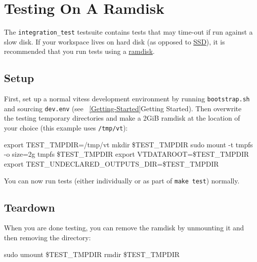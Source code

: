 \section{Testing On A Ramdisk}\label{Testing-On-A-Ramdisk}

The {\tt integration\_test} testsuite contains tests that may time-out if run against a slow disk. If your workspace lives on hard disk (as opposed to \href{http://en.wikipedia.org/wiki/Solid-state\_drive}{SSD}), it is recommended that you run tests using a \href{http://en.wikipedia.org/wiki/RAM\_drive}{ramdisk}.

\subsection{Setup}\hypertarget{setup}{}\label{setup}

First, set up a normal vitess development environment by running {\tt bootstrap.sh} and sourcing {\tt dev.env} (see ~\ref{Getting-Started}{Getting Started}). Then overwrite the testing temporary directories and make a 2GiB ramdisk at the location of your choice (this example uses {\tt /tmp/vt}):

\begin{codesample2}
  export TEST_TMPDIR=/tmp/vt
  mkdir \${TEST_TMPDIR}
  sudo mount -t tmpfs -o size=2g tmpfs \${TEST_TMPDIR}
  export VTDATAROOT=\${TEST_TMPDIR}
  export TEST_UNDECLARED_OUTPUTS_DIR=\${TEST_TMPDIR}
\end{codesample2}


You can now run tests (either individually or as part of {\tt make test}) normally.

\subsection{Teardown}\hypertarget{teardown}{}\label{teardown}

When you are done testing, you can remove the ramdisk by unmounting it and then removing the directory:

\begin{codesample2}
  sudo umount \${TEST_TMPDIR}
  rmdir \${TEST_TMPDIR}
\end{codesample2}

